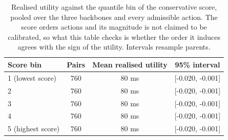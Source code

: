 \documentclass{article}
\begin{document}
\begin{table}[h]
  \caption{Operating points over the penalty grid, with the neighbourhood size frozen at the
  selected value on each backbone. Intervention rate is the share of requests on which a
  non-reference action ran, and conditional HIR is the share of those that raised the loss.
  Raising the penalty moves the rate and leaves the conditional rate close to where it was, so
  what the rule controls is how often it acts rather than how often an executed action hurts.}
  \label{tab:app-operating}
  \centering
  \small
  \setlength{\tabcolsep}{4pt}
\end{table}

\begin{table}[h]
  \caption{Realised utility against the quantile bin of the conservative score, pooled over the
  three backbones and every admissible action. The score orders actions and its magnitude is
  not claimed to be calibrated, so what this table checks is whether the order it induces
  agrees with the sign of the utility. Intervals resample parents.}
  \label{tab:app-scorebins}
  \centering
  \small
  \setlength{\tabcolsep}{4pt}
\begin{tabular}{lccc}
    \toprule
    Score bin & Pairs & Mean realised utility & 95\% interval \\
    \midrule
    1 (lowest score) & 760 & 80 ms & [-0.020, -0.001] \\
    2 & 760 & 80 ms & [-0.020, -0.001] \\
    3 & 760 & 80 ms & [-0.020, -0.001] \\
    4 & 760 & 80 ms & [-0.020, -0.001] \\
    5 (highest score) & 760 & 80 ms & [-0.020, -0.001] \\
    \bottomrule
  \end{tabular}
\end{table}
\end{document}
